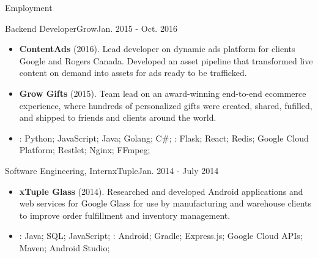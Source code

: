 \documentclass[]{mcdowellcv}
\begin{document}
\begin{cvsection}{Employment}
        \begin{cvsubsection}{Backend Developer}{Grow}{Jan. 2015 - Oct. 2016}
            \begin{itemize}
                \item \textbf{ContentAds} (2016). Lead developer on dynamic ads platform for clients Google and Rogers Canada. Developed an asset pipeline that transformed live content on demand into assets for ads ready to be trafficked.
            \end{itemize}
            \begin{itemize}
                \item \textbf{Grow Gifts} (2015). Team lead on an award-winning end-to-end ecommerce experience, where hundreds of personalized gifts were created, shared, fufilled, and shipped to friends and clients around the world.
            \end{itemize}
            \begin{itemize}
                 \item {}: Python; JavaScript; Java; Golang; C\#; \newline
                : Flask; React; Redis; Google Cloud Platform; Restlet; Nginx; FFmpeg;
            \end{itemize}
        \end{cvsubsection}

        \begin{cvsubsection}{Software Engineering, Intern}{xTuple}{Jan. 2014 - July 2014}
            \begin{itemize}
                \item \textbf{xTuple Glass} (2014). Researched and developed Android applications and web services for Google Glass for use by manufacturing and warehouse clients to improve order fulfillment and inventory management.
            \end{itemize}
            \begin{itemize}
                 \item {}: Java; SQL; JavaScript; \newline
                : Android; Gradle; Express.js; Google Cloud APIs; Maven; Android Studio;
            \end{itemize}
        \end{cvsubsection}


\end{cvsection}
\end{document}
